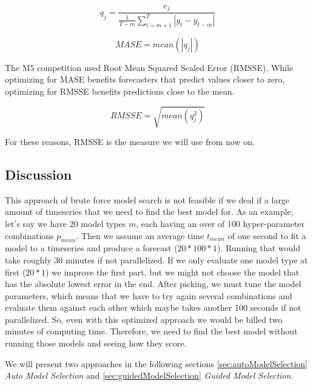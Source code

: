\begin{equation}
    q_j=\frac{e_j}{\frac{1}{T-m}\sum\limits_{t=m+1}^T|y_{t}-y_{t-m}|}
    \label{eq:mase_q}
\end{equation}

\begin{equation}
    MASE=mean(|q_{j}|)
    \label{eq:mase}
\end{equation}


The M5 competition used Root Mean Squared Scaled Error (RMSSE). While optimizing for MASE benefits forecasters that predict values closer to zero, optimizing for RMSSE benefits predictions close to the mean. 

\begin{equation}
    RMSSE=\sqrt{mean(q_j^2)}
    \label{eq:rmsse}
\end{equation}

For these reasons, RMSSE is the measure we will use from now on.


\subsection{Discussion}

This approach of brute force model search is not feasible if we deal if a large amount of timeseries that we need to find the best model for. As an example, let's say we have 20 model types \(m\), each having an over of 100 hyper-parameter combinations \(p_{mean}\). Then we assume an average time \(t_{mean}\) of one second to fit a model to a timeseries and produce a forecast (\(20*100*1\)). Running that would take roughly 30 minutes if not parallelized. If we only evaluate one model type at first (\(20*1\)) we improve the first part, but we might not choose the model that has the absolute lowest error in the end. After picking, we must tune the model parameters, which means that we have to try again several combinations and evaluate them against each other which maybe takes another 100 seconds if not parallelized. So, even with this optimized approach we would be billed two minutes of computing time. Therefore, we need to find the best model without running those models and seeing how they score.

We will present two approaches in the following sections \ref{sec:autoModelSelection} \emph{Auto Model Selection} and \ref{sec:guidedModelSelection} \emph{Guided Model Selection}.

